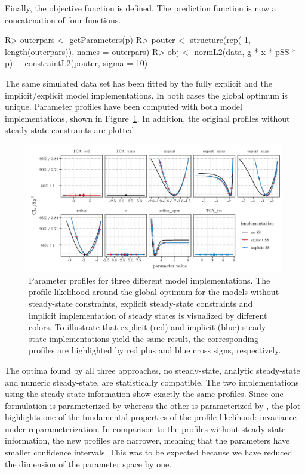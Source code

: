 \documentclass[article]{jss}
\begin{document}
%
Finally, the objective function is defined. The prediction function is now a concatenation of four functions.
%
\begin{CodeChunk}
\begin{CodeInput}
R> outerpars <- getParameters(p)
R> pouter <- structure(rep(-1, length(outerpars)), names = outerpars)
R> obj <- normL2(data, g * x * pSS * p) + constraintL2(pouter, sigma = 10)
\end{CodeInput}
\end{CodeChunk}
%
The same simulated data set has been fitted by the fully explicit and the implicit/explicit model implementations. In both cases the global optimum is unique. Parameter profiles have been computed with both model implementations, shown in Figure~\ref{fig:allprofiles}. In addition, the original profiles without steady-state constraints are plotted.
%
\begin{figure}[t!]
\centering
\includegraphics[width = \textwidth]{Figures/figure8}
\caption{Parameter profiles for three different model implementations. The profile likelihood around the global optimum for the models without steady-state constraints, explicit steady-state constraints and implicit implementation of steady states is visualized by different colors. To illustrate that explicit (red) and implicit (blue) steady-state implementations yield the same result, the corresponding profiles are highlighted by red plus and blue cross signs, respectively.
\label{fig:allprofiles}}
\end{figure}
%
The optima found by all three approaches, no steady-state, analytic steady-state and numeric steady-state, are statistically compatible. The two implementations using the steady-state information show exactly the same profiles. Since one formulation is parameterized by  whereas the other is parameterized by , the plot highlights one of the fundamental properties of the profile likelihood: invariance under reparameterization. In comparison to the profiles without steady-state information, the new profiles are narrower, meaning that the parameters have smaller confidence intervals. This was to be expected because we have reduced the dimension of the parameter space by one.
\end{document}
